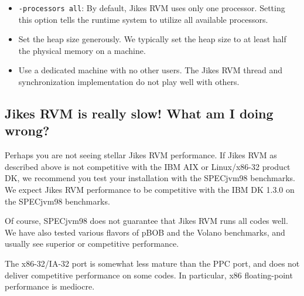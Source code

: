 \begin{itemize}
\item {\tt -processors all}: By default, Jikes\TMweb{} RVM uses only
one processor.  Setting this option tells the runtime system to
utilize all available processors. 
\item Set the heap size generously.  We typically set the heap size to
at least half the physical memory on a machine. 
\item Use a dedicated machine with no other users.  The Jikes RVM
thread and synchronization implementation do not play well with
others. 
\end{itemize}

\subsection{Jikes RVM is really slow! What am I doing wrong?}

Perhaps you are not seeing stellar Jikes\TMweb{} RVM performance.
If Jikes RVM as described above is not competitive with the IBM
AIX\TMweb{} or Linux\Rweb/x86-32 product DK, we recommend you test
your installation with the SPECjvm\TMweb{}98 benchmarks.  We expect Jikes RVM
performance to be competitive with the IBM\Rweb{} DK 1.3.0 on the SPECjvm98
benchmarks.

Of course, SPECjvm98 does not guarantee that Jikes RVM runs all codes
well.  We have also tested various flavors of pBOB and the Volano
benchmarks, and usually see superior or competitive performance.

The x86-32\-/\-IA-32 port is somewhat less mature than the PPC port, and does not
deliver competitive performance on some codes.  In particular, x86
floating-point performance is mediocre.


